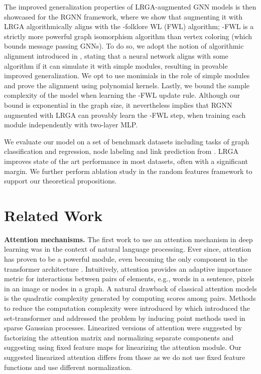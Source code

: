 \documentclass{article} \usepackage{iclr2021_conference,times}
\newcommand{\eg}{{e.g.}}
\begin{document}
The improved generalization properties of LRGA-augmented GNN models is then showcased for the RGNN framework, where we show that augmenting it with LRGA algorithmically aligns with the -folklore WL (FWL) algorithm; -FWL is a strictly more powerful graph isomorphism algorithm than vertex coloring (which bounds message passing GNNs). To do so, we adopt the notion of algorithmic alignment introduced in \citep{Xu2019algoalign}, stating that a neural network aligns with some algorithm if it can simulate it with simple modules, resulting in provable improved generalization. We opt to use monimials in the role of simple modules and prove the alignment using polynomial kernels. Lastly, we bound the sample complexity of the model when learning the -FWL update rule. Although our bound is exponential in the graph size, it nevertheless implies that RGNN augmented with LRGA can provably learn the -FWL step, when training each module independently with two-layer MLP.










We evaluate our model on a set of benchmark datasets including tasks of graph classification and regression, node labeling and link prediction from \citep{dwivedi2020benchmarking, Hu2020}. LRGA improves state of the art performance in most datasets, often with a significant margin. We further perform ablation study in the random features framework to support our theoretical propositions.
\section{Related Work}


\textbf{Attention mechanisms.} The first work to use an attention mechanism in deep learning was \citep{Bahdanau2015a} in the context of natural language processing. Ever since, attention has proven to be a powerful module, even becoming the only component in the transformer architecture \citep{vaswani2017attention}. Intuitively, attention provides an adaptive importance metric for interactions between pairs of elements, \eg, words in a sentence, pixels in an image or nodes in a graph.
A natural drawback of classical attention models is the quadratic complexity generated by computing scores among pairs. Methods to reduce the computation complexity were introduced by \citep{lee2018set} which introduced the set-transformer and addressed the problem by inducing point methods used in sparse Gaussian processes. Linearized versions of attention were suggested by \citep{shen2018} factorizing the attention matrix and normalizing separate components and \citep{katharopoulos2020transformers} suggesting  using fixed feature maps for linearizing the attention module. Our suggested linearized attention differs from those as we do not use fixed feature functions and use different normalization.
\end{document}
